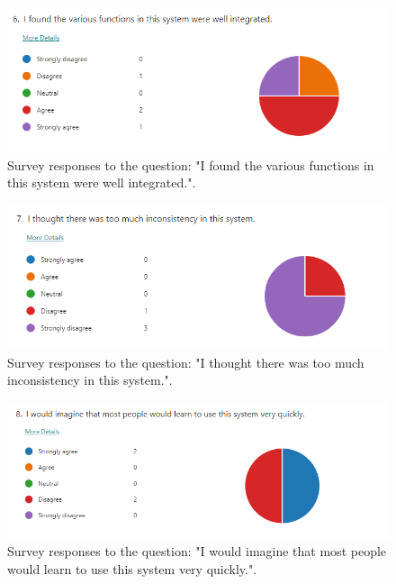 \documentclass{l4proj}
\begin{document}
\begin{appendices}
\begin{figure}[h]
    \centering
    \includegraphics[width=0.9\linewidth]{images/usability5.png}    

    \caption{Survey responses to the question: "I found the various functions in this system were well integrated.".}
    \label{fig:usability5} 
\end{figure}

\begin{figure}[h]
    \centering
    \includegraphics[width=0.9\linewidth]{images/usability6.png}    

    \caption{Survey responses to the question: "I thought there was too much inconsistency in this system.".}
    \label{fig:usability6} 
\end{figure}

\begin{figure}[h]
    \centering
    \includegraphics[width=0.9\linewidth]{images/usability7.png}    

    \caption{Survey responses to the question: "I would imagine that most people would learn to use this system very quickly.".}
    \label{fig:usability7} 
\end{figure}


\end{appendices}
\end{document}
